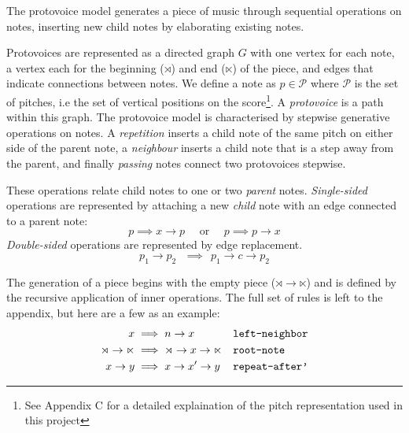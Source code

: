 \documentclass[12pt,a4paper,twoside,openright]{report}
\theoremstyle{definition}
\begin{document}
The protovoice model generates a piece of music through sequential operations on notes, inserting new child notes by elaborating existing notes.

Protovoices are represented as a directed graph $G$ with one vertex for each note, a vertex each for the beginning ($\rtimes$) and end ($\ltimes$) of the piece, and edges that indicate connections between notes.
We define a note as $p \in \mathcal{P}$ where $\mathcal{P}$ is the set of pitches, i.e the set of vertical positions on the score\footnote{See Appendix C for a detailed explaination of the pitch representation used in this project}. 
A \textit{protovoice} is a path within this graph.
The protovoice model is characterised by stepwise generative operations on notes. A \textit{repetition} inserts a child note of the same pitch on either side of the parent note, a \textit{neighbour} inserts a child note that is a step away from the parent, and finally \textit{passing} notes connect two protovoices stepwise.


These operations relate child notes to one or two \textit{parent} notes.
\textit{Single-sided} operations are represented by attaching a new \textit{child} note with an edge connected to a parent note: 
\begin{equation}
  p \implies x \to p \text{~~~~or~~~~} p \implies p \to x 
  \label{eq:singlesidedinnerop}
\end{equation}
\textit{Double-sided} operations are represented by edge replacement. 
\begin{equation}
  p_1 \to p_2 ~~~\implies~~ p_1 \to c \to p_2 \label{edge replacement}
  \label{eq:doublesidedinnerop}
\end{equation}

The generation of a piece begins with the empty piece ($\rtimes \to \ltimes$) and is defined by the recursive application of inner operations. The full set of rules is left to the appendix, but here are a few as an example:
\begin{equation}
  \begin{align}
    x &\implies n \to x && \text{\texttt{left-neighbor}}
  \label{eq:leftNeighbor} \\
    \rtimes \to \ltimes &\implies \rtimes \to x \to \ltimes && \text{\texttt{root-note}}
  \label{eq:rootNote} \\
    x \to y &\implies x \to x' \to y && \text{\texttt{repeat-after'}}
  \label{eq:repeatAfter}\\
  \end{align} 
\end{equation}
\end{document}
